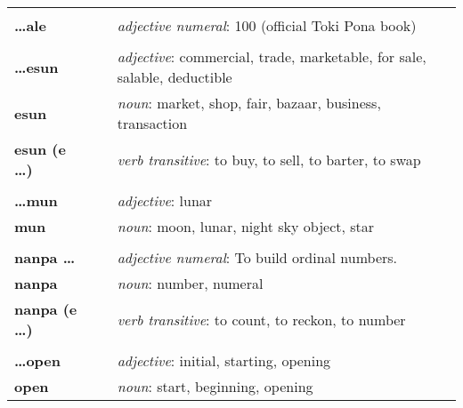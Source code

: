 \begin{supertabular}{p{2,5cm}|ll}
                             &  &                                                                                  \\
    \textbf{\dots ale}       &  & \textit{adjective numeral}: 100 (official Toki Pona book)                        \\
                             &  &                                                                                  \\
    \textbf{\dots esun}      &  & \textit{adjective}: commercial, trade, marketable, for sale, salable, deductible \\
    \textbf{esun}            &  & \textit{noun}: market, shop, fair, bazaar, business, transaction                 \\
    \textbf{esun (e \dots)}  &  & \textit{verb transitive}: to buy, to sell, to barter, to swap                    \\
                             &  &                                                                                  \\
    \textbf{\dots mun}       &  & \textit{adjective}: lunar                                                        \\
    \textbf{mun}             &  & \textit{noun}: moon, lunar, night sky object, star                               \\
                             &  &                                                                                  \\
    \textbf{nanpa \dots}     &  & \textit{adjective numeral}: To build ordinal numbers.                            \\
    \textbf{nanpa}           &  & \textit{noun}: number, numeral                                                   \\
    \textbf{nanpa (e \dots)} &  & \textit{verb transitive}: to count, to reckon,  to number                        \\
                             &  &                                                                                  \\
    \textbf{\dots open}      &  & \textit{adjective}: initial, starting, opening                                   \\
    \textbf{open}            &  & \textit{noun}: start, beginning, opening                                         \\

\end{supertabular}
